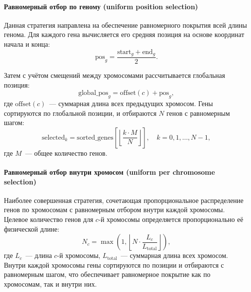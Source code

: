 \paragraph{Равномерный отбор по геному (uniform position selection)}

Данная стратегия направлена на обеспечение равномерного покрытия всей 
длины генома. Для каждого гена вычисляется его средняя позиция на 
основе координат начала и конца:
\[
\text{pos}_g = \frac{\text{start}_g + \text{end}_g}{2}.
\]

Затем с учётом смещений между хромосомами рассчитывается глобальная 
позиция:
\[
\text{global\_pos}_g = \text{offset}(c) + \text{pos}_g,
\]
где $\text{offset}(c)$~--- суммарная длина всех предыдущих хромосом. 
Гены сортируются по глобальной позиции, и отбираются $N$ генов с 
равномерным шагом:
\[
\text{selected}_k = \text{sorted\_genes}\left[\left\lfloor \frac{k \cdot M}{N} \right\rfloor\right], \quad k = 0, 1, \dots, N-1,
\]
где $M$~--- общее количество генов.

\paragraph{Равномерный отбор внутри хромосом (uniform per chromosome selection)}

Наиболее совершенная стратегия, сочетающая пропорциональное 
распределение генов по хромосомам с равномерным отбором внутри каждой 
хромосомы. Целевое количество генов для $c$-й хромосомы определяется 
пропорционально её физической длине:
\[
N_c = \max\left(1, \left\lfloor N \cdot \frac{L_c}{L_{\text{total}}} \right\rfloor\right),
\]
где $L_c$~--- длина $c$-й хромосомы, $L_{\text{total}}$~--- суммарная 
длина всех хромосом. Внутри каждой хромосомы гены сортируются по 
позиции и отбираются с равномерным шагом, что обеспечивает равномерное 
покрытие как по хромосомам, так и внутри них.


	
	
